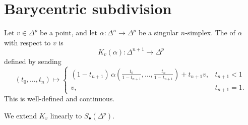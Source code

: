 \documentclass[main.tex]{subfiles}
\begin{document}
\section{Barycentric subdivision}
\label{sec:barycentric_subdivision}

\begin{definition}
  \label{def:cone_maps}
  Let \(v \in \Delta^{p}\) be a point, and let \(\alpha\colon \Delta^{n} \to \Delta^{p}\) be a singular \(n\)-simplex. The  of \(\alpha\) with respect to \(v\) is
  \begin{equation*}
    K_{v}(\alpha)\colon \Delta^{n+1} \to \Delta^{p}
  \end{equation*}
  defined by sending
  \begin{equation*}
    (t_{0}, \ldots, t_{n}) \mapsto
    \begin{cases}
      (1 - t_{n+1})\, \alpha(\frac{t_{0}}{1-t_{n+1}}, \ldots, \frac{t_{n}}{1-t_{n+1}}) + t_{n+1}v, &t_{n+1} < 1 \\
      v, & t_{n+1} = 1.
    \end{cases}
  \end{equation*}
  This is well-defined and continuous.

  We extend \(K_{v}\) linearly to \(S_{\bullet}(\Delta^{p})\).
\end{definition}
\end{document}

